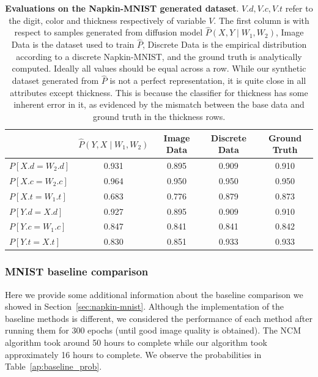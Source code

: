 \documentclass{article}
\theoremstyle{plain}
\theoremstyle{definition}
\theoremstyle{remark}
\begin{document}
	\begin{table}[H]
		\centering
		\caption{\textbf{Evaluations on the Napkin-MNIST generated dataset}. $V.d, V.c, V.t$ refer to the digit, color and thickness respectively of variable $V$. The first column is with respect to samples generated from diffusion model $\hat{P}(X,Y\mid W_1, W_2)$, Image Data is the dataset used to train $\hat{P}$, Discrete Data is the empirical distribution according to a discrete Napkin-MNIST, and the ground truth is analytically computed. Ideally all values should be equal across a row. While our synthetic dataset generated from $\hat{P}$ is not a perfect representation, it is quite close in all attributes except thickness. This is because the classifier for thickness has some inherent error in it, as evidenced by the mismatch between the base data and ground truth in the thickness rows.}
		\begin{tabular}{@{}lcccc@{}}
			\toprule
			& $\hat{P}(Y, X\mid W_1, W_2)$ & Image Data & Discrete Data & Ground Truth \\ \midrule
			$P[X.d=W_2.d]$ & 0.931 & 0.895 & 0.909 & 0.910 \\ 
			$P[X.c=W_2.c]$ & 0.964 & 0.950 & 0.950 & 0.950 \\ 
			$P[X.t=W_1.t]$ & 0.683 & 0.776 & 0.879 & 0.873 \\ 
			$P[Y.d=X.d]$ & 0.927 & 0.895 & 0.909 & 0.910 \\ 
			$P[Y.c=W_1.c]$ & 0.847 & 0.841 & 0.841 & 0.842 \\ 
			$P[Y.t=X.t]$ & 0.830 & 0.851 & 0.933 & 0.933 \\ 
			\bottomrule
		\end{tabular}
		\label{tab:dataset_eval}
	\end{table}
	
	
	\subsubsection{MNIST baseline comparison}
 Here we provide some additional information about the baseline comparison we showed in Section~\ref{sec:napkin-mnist}.
	Although the implementation of the baseline methods is different,
	we considered the performance of each method after running them for 300 epochs (until good image quality is obtained). The NCM algorithm took around 50 hours
	to complete while our algorithm took approximately 16 hours to complete.
	We observe the probabilities in Table~\ref{ap:baseline_prob}. 
	
\end{document}
